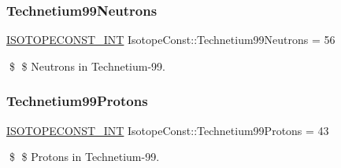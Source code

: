 \subsubsection{\texorpdfstring{Technetium99\+Neutrons}{Technetium99Neutrons}}
{\footnotesize\ttfamily \mbox{\hyperlink{group___isotope_const-_macros_ga5f18360b3e99483a35c32d789e62621c}{I\+S\+O\+T\+O\+P\+E\+C\+O\+N\+S\+T\+\_\+\+I\+NT}} Isotope\+Const\+::\+Technetium99\+Neutrons = 56}

\$ \$ Neutrons in Technetium-\/99. \mbox{\label{group___isotope_const-_technetium-_tc99_ga6396ed0e483ffb00f6918aeff9e3fa12}} 
\subsubsection{\texorpdfstring{Technetium99\+Protons}{Technetium99Protons}}
{\footnotesize\ttfamily \mbox{\hyperlink{group___isotope_const-_macros_ga5f18360b3e99483a35c32d789e62621c}{I\+S\+O\+T\+O\+P\+E\+C\+O\+N\+S\+T\+\_\+\+I\+NT}} Isotope\+Const\+::\+Technetium99\+Protons = 43}

\$ \$ Protons in Technetium-\/99. 